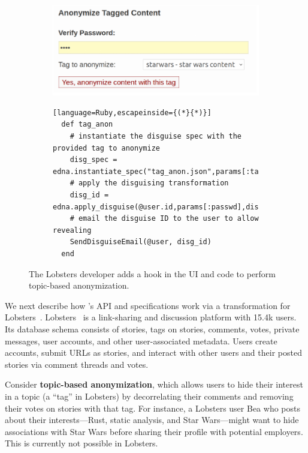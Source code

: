 \begin{figure}[h]
  \centering
  \begin{subfigure}[h]{0.5\columnwidth}
  \includegraphics[width=\columnwidth]{figs/lobsters_catanon}
  \end{subfigure}
  \begin{subfigure}[h]{\columnwidth}
  \begin{lstlisting}[language=Ruby,escapeinside={(*}{*)}]
  def tag_anon
    # instantiate the disguise spec with the provided tag to anonymize
    disg_spec = edna.instantiate_spec("tag_anon.json",params[:tag])
    # apply the disguising transformation
    disg_id = edna.apply_disguise(@user.id,params[:passwd],disg_spec)
    # email the disguise ID to the user to allow revealing
    SendDisguiseEmail(@user, disg_id)
  end
  \end{lstlisting}
  \end{subfigure}
  \vspace*{-1em}
  \caption{The Lobsters developer adds a hook in the UI and code to perform
      topic-based anonymization.}
  \label{f:lobsters_hook}
  \end{figure}

We next describe how \sys's API and \xx specifications work via a \xxing
transformation for Lobsters~\cite{lobsters}.  Lobsters~\cite{lobsters} is a
link-sharing and discussion platform with 15.4k
users.
%
Its database schema consists of stories, tags on stories, comments, votes,
private messages, user accounts, and other user-associated metadata.
%
Users create accounts, submit URLs as stories, and interact with other users
and their posted stories via comment threads and votes.
%

Consider \textbf{topic-based anonymization}, which allows users to
hide their interest in a topic (a ``tag'' in Lobsters) by decorrelating
their comments and removing their votes on stories with that tag.
%
For instance, a Lobsters user Bea who posts about their interests---Rust,
static analysis, and Star Wars---might want to hide associations with
Star Wars before sharing their profile with potential employers.
%
This is currently not possible in Lobsters.

